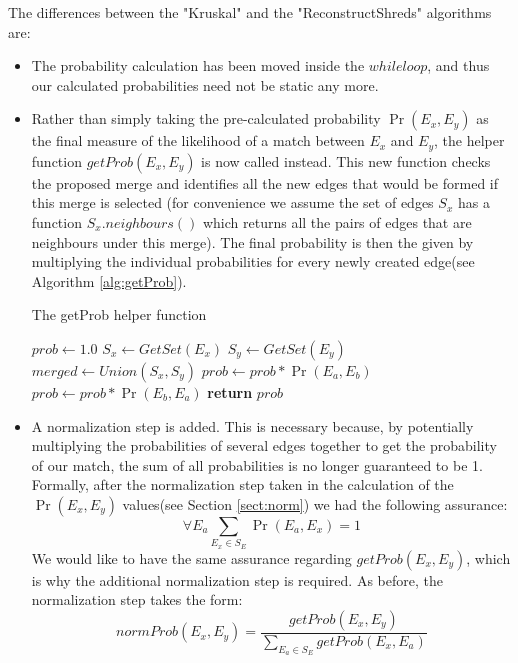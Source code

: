 The differences between the "Kruskal" and the "ReconstructShreds" algorithms are:
\begin{itemize}
\item The probability calculation has been moved inside the $while loop$, and thus our calculated probabilities need not be static any more.
\item Rather than simply taking the pre-calculated probability $\Pr(E_x,E_y)$ as the final measure of the likelihood of a match between $E_x$ and $E_y$, the helper function $getProb(E_x,E_y)$ is now called instead. This new function checks the proposed merge and identifies all the new edges that would be formed if this merge is selected (for convenience we assume the set of edges $S_x$ has a function $S_x.neighbours()$ which returns all the pairs of edges that are neighbours under this merge). The final probability is then the given by multiplying the individual probabilities for every newly created edge(see Algorithm \ref{alg:getProb}).

\begin{algorithm}[h]
\caption{The getProb helper function}
\begin{algorithmic}[1]
  \State $prob \gets 1.0$
  \State $S_x \gets GetSet(E_x)$ 
  \State $S_y \gets GetSet(E_y)$ 
  \State $merged \gets Union(S_x,S_y)$ 
   
      \State $prob \gets prob * \Pr(E_a,E_b)$
      \State $prob \gets prob * \Pr(E_b,E_a)$
      \EndIf
    \EndFor
  \EndFor
  \State \textbf{return} $prob$
\EndProcedure
\end{algorithmic}
\label{alg:getProb}
\end{algorithm}

\newpage
\item A normalization step is added. This is necessary because, by potentially multiplying the probabilities of several edges together to get the probability of our match, the sum of all probabilities is no longer guaranteed to be 1. Formally, after the normalization step taken in the calculation of the $\Pr(E_x,E_y)$ values(see Section \ref{sect:norm}) we had the following assurance: \[\forall E_a \sum_{E_x \in S_E} \Pr(E_a,E_x) = 1 \] We would like to have the same assurance regarding $getProb(E_x,E_y)$, which is why the additional normalization step is required. As before, the normalization step takes the form: \[ normProb(E_x,E_y) = \frac{getProb(E_x,E_y)}{\sum_{E_a \in S_E} getProb(E_x,E_a)} \]
\end{itemize}



